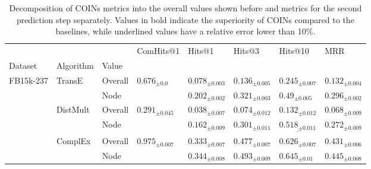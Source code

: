 \begin{table}[ht!]
  \caption[Decomposition of COINs metrics into the overall values and metrics for the second prediction step separately.]{Decomposition of COINs metrics into the overall values shown before and metrics for the second prediction step separately. Values in bold indicate the superiority of COINs compared to the baselines, while underlined values have a relative error lower than 10\%.}
  \label{tab:performance_query_answering_2}%
  \centering
  \begin{adjustbox}{width=\textwidth}%
\begin{tabular}{llllllll}
\toprule
         &           &      &                ComHits@1 &                             Hits@1 &                             Hits@3 &                            Hits@10 &                                MRR \\
Dataset & Algorithm & Value &                          &                                    &                                    &                                    &                                    \\
\midrule
FB15k-237 & TransE & Overall &    ${{0.676}_{\pm 0.0}}$ &            ${{0.078}_{\pm 0.003}}$ &            ${{0.136}_{\pm 0.005}}$ &            ${{0.245}_{\pm 0.007}}$ &            ${{0.132}_{\pm 0.004}}$ \\
         &           & Node &                          &     $\mathbf{{0.202}_{\pm 0.002}}$ &     $\mathbf{{0.321}_{\pm 0.003}}$ &      $\mathbf{{0.49}_{\pm 0.005}}$ &     $\mathbf{{0.296}_{\pm 0.002}}$ \\
         & DistMult & Overall &  ${{0.291}_{\pm 0.045}}$ &            ${{0.038}_{\pm 0.007}}$ &            ${{0.074}_{\pm 0.012}}$ &            ${{0.132}_{\pm 0.012}}$ &            ${{0.068}_{\pm 0.009}}$ \\
         &           & Node &                          &            ${{0.162}_{\pm 0.009}}$ &            ${{0.301}_{\pm 0.011}}$ &  $\underline{{0.518}_{\pm 0.011}}$ &            ${{0.272}_{\pm 0.009}}$ \\
         & ComplEx & Overall &  ${{0.975}_{\pm 0.007}}$ &     $\mathbf{{0.333}_{\pm 0.007}}$ &     $\mathbf{{0.477}_{\pm 0.007}}$ &     $\mathbf{{0.626}_{\pm 0.007}}$ &     $\mathbf{{0.431}_{\pm 0.006}}$ \\
         &           & Node &                          &     $\mathbf{{0.344}_{\pm 0.008}}$ &     $\mathbf{{0.493}_{\pm 0.009}}$ &      $\mathbf{{0.645}_{\pm 0.01}}$ &     $\mathbf{{0.445}_{\pm 0.008}}$ \\

\end{tabular}
\end{adjustbox}
\end{table}
